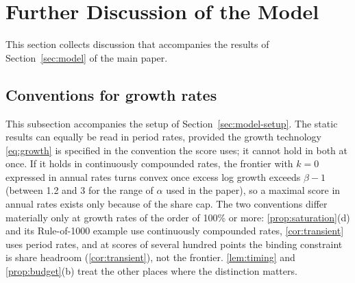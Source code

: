 \section{Further Discussion of the Model}\label{supp:model}
This section collects discussion that accompanies the results of Section~\ref{sec:model} of the main paper.

\subsection{Conventions for growth rates}\label{supp:model-rates}
This subsection accompanies the setup of Section~\ref{sec:model-setup}. The static results can equally be read in period rates, provided the growth technology \eqref{eq:growth} is specified in the convention the score uses; it cannot hold in both at once. If it holds in continuously compounded rates, the frontier with $k=0$ expressed in annual rates turns convex once excess log growth exceeds $\beta-1$ (between 1.2 and 3 for the range of $\alpha$ used in the paper), so a maximal score in annual rates exists only because of the share cap. The two conventions differ materially only at growth rates of the order of 100\% or more: \autoref{prop:saturation}(d) and its Rule-of-1000 example use continuously compounded rates, \autoref{cor:transient} uses period rates, and at scores of several hundred points the binding constraint is share headroom (\autoref{cor:transient}), not the frontier. \autoref{lem:timing} and \autoref{prop:budget}(b) treat the other places where the distinction matters.

